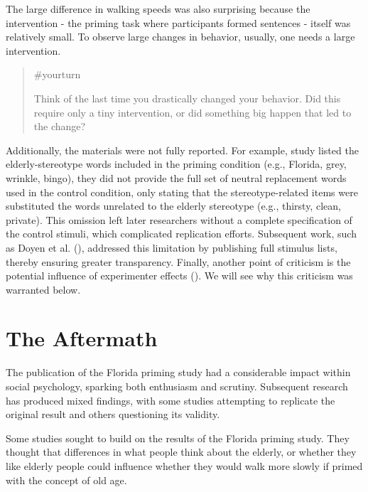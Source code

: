 \documentclass[
  letterpaper,
]{book}
\begin{document}
The large difference in walking speeds was also surprising because the
intervention - the priming task where participants formed sentences -
itself was relatively small. To observe large changes in behavior,
usually, one needs a large intervention.

\begin{quote}
{\#yourturn}

Think of the last time you drastically changed your behavior. Did this
require only a tiny intervention, or did something big happen that led
to the change?
\end{quote}

Additionally, the materials were not fully reported. For example, study
listed the elderly-stereotype words included in the priming condition
(e.g., Florida, grey, wrinkle, bingo), they did not provide the full set
of neutral replacement words used in the control condition, only stating
that the stereotype-related items were substituted the words unrelated
to the elderly stereotype (e.g., thirsty, clean, private). This omission
left later researchers without a complete specification of the control
stimuli, which complicated replication efforts. Subsequent work, such as
Doyen et al. (), addressed
this limitation by publishing full stimulus lists, thereby ensuring
greater transparency. Finally, another point of criticism is the
potential influence of experimenter effects
(). We will see
why this criticism was warranted below.

\section{The Aftermath}\label{the-aftermath-23}

The publication of the Florida priming study had a considerable impact
within social psychology, sparking both enthusiasm and scrutiny.
Subsequent research has produced mixed findings, with some studies
attempting to replicate the original result and others questioning its
validity.

Some studies sought to build on the results of the Florida priming
study. They thought that differences in what people think about the
elderly, or whether they like elderly people could influence whether
they would walk more slowly if primed with the concept of old age.
\end{document}
